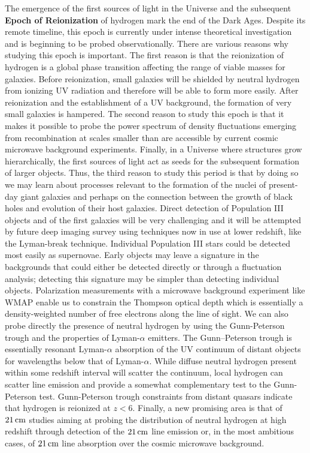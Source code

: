 \documentclass[a4paper,11pt]{article}
\begin{document}
The emergence of the first sources of light in the Universe and the subsequent \textbf{Epoch of Reionization} of hydrogen mark the end of the Dark Ages. Despite its remote timeline, this epoch is currently under intense theoretical investigation and is beginning to be probed observationally. There are various reasons why studying this epoch is important. The first reason is that the reionization of hydrogen is a global phase transition affecting the range of viable masses for galaxies. Before reionization, small galaxies will be shielded by neutral hydrogen from ionizing UV radiation and therefore will be able to form more easily. After reionization and the establishment of a UV background, the formation of very small galaxies is hampered. The second reason to study this epoch is that it makes it possible to probe the power spectrum of density fluctuations emerging from recombination at scales smaller than are accessible by current cosmic microwave background experiments. Finally, in a Universe where structures grow hierarchically, the first sources of light act as seeds for the subsequent formation of larger objects. Thus, the third reason to study this period is that by doing so we may learn about processes relevant to the formation of the nuclei of present-day giant galaxies and perhaps on the connection between the growth of black holes and evolution of their host galaxies. Direct detection of Population III objects and of the first galaxies will be very challenging and it will be attempted by future deep imaging survey using techniques now in use at lower redshift, like the Lyman-break technique. Individual Population III stars could be detected most easily as supernovae. Early objects may leave a signature in the backgrounds that could either be detected directly or through a fluctuation analysis; detecting this signature may be simpler than detecting individual objects. Polarization measurements with a microwave background experiment like WMAP enable us to constrain the Thompson optical depth which is essentially a density-weighted number of free electrons along the line of sight. We can also probe directly the presence of neutral hydrogen by using the Gunn-Peterson trough and the properties of Lyman-$\alpha$ emitters. The Gunn–Peterson trough is essentially resonant Lyman-$\alpha$ absorption of the UV continuum of distant objects for wavelengths below that of Lyman-$\alpha$. While diffuse neutral hydrogen present within some redshift interval will scatter the continuum, local hydrogen can scatter line emission and provide a somewhat complementary test to the Gunn-Peterson test. Gunn-Peterson trough constraints from distant quasars indicate that hydrogen is reionized at $z<6$. Finally, a new promising area is that of $21\,{\rm cm}$ studies aiming at probing the distribution of neutral hydrogen at high redshift through detection of the $21\,{\rm cm}$ line emission or, in the most ambitious cases, of $21\,{\rm cm}$ line absorption over the cosmic microwave background.
\end{document}
